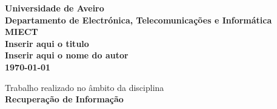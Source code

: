 \documentclass[a4paper,12pt]{article}
\begin{document}

\def \course {MIECT} %

\def \title {Inserir aqui o titulo}

\def \author {Inserir aqui o nome do autor}


\pagestyle{fancy}
\fancyhead{}
\fancyfoot{}
\renewcommand{\headrulewidth}{0pt}

\fancyfoot[R]{\thepage}

\begin{titlepage}
\begin{center}

\textbf{\fontsize{16}{16}\selectfont Universidade de Aveiro}\\[0.5cm]

\textbf{\fontsize{16}{16}\selectfont Departamento de Electrónica, Telecomunicações e Informática}\\[0.5cm]

\textbf{\fontsize{16}{16}\selectfont \course}\\[3.5cm]

\textbf{\fontsize{18}{18}\selectfont \title}\\[4.5cm]

\textbf{\fontsize{18}{18}\selectfont \author}\\[0.5cm]

\textbf{\fontsize{18}{18}\selectfont \today}\\[0.5cm]

\vfill

\fontsize{14}{14}\selectfont Trabalho realizado no âmbito da disciplina \\
\textbf{\fontsize{16}{16}\selectfont Recuperação de Informação}

\end{center}
\end{titlepage}


\renewcommand{\contentsname}{Índice}

\tableofcontents

\newpage








\end{document}
